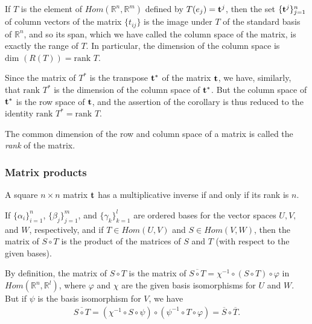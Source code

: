 \documentclass[12pt,letterpaper,reqno]{article}
\numberwithin{equation}{section}
\newcommand{\ti}[1]{\textit{#1}}
\newcommand{\fixme}[1]{{\color{orange}{[#1]}}}
\begin{document}
\begin{pf}
	If $T$ is the element of $Hom(\mathbb{R}^n,\mathbb{R}^m)$ defined by $T(e_j)={\bf t}^j$, then the set $\{{\bf t}^j\}_{j=1}^n$ of column vectors of the matrix $\{t_{ij}\}$ is the image under $T$ of the standard basis of $\mathbb{R}^n$, and so its span, which we have called the column space of the matrix, is exactly the range of $T$. In particular, the dimension of the column space is $\text{dim }(R(T))=\text{rank }T$.
	
	Since the matrix of $T^*$ is the transpose ${\bf t}^*$ of the matrix ${\bf t}$, we have, similarly, that $\text{rank }T^*$ is the dimension of the column space of ${\bf t}^*$. But the column space of ${\bf t}^*$ is the row space of ${\bf t}$, and the assertion of the corollary is thus reduced to the identity $\text{rank }T^*=\text{rank }T$.
\end{pf}

\begin{defn}
	The common dimension of the row and column space of a matrix is called the \ti{rank} of the matrix.
\end{defn}

\subsubsection{Matrix products}
\fixme{Most of this already done in a previous chapter.}
\begin{thm}
	A square $n \times n$ matrix ${\bf t}$ has a multiplicative inverse if and only if its rank is $n$.
\end{thm}

\fixme{For this and the rank theorem there are simpler proofs bases on the RREF of a matrix.}

\begin{thm}
	If $\{\alpha_i\}_{i=1}^n$, $\{\beta_j\}_{j=1}^m$, and $\{\gamma_k\}_{k=1}^l$ are ordered bases for the vector spaces $U,V,$ and $W$, respectively, and if $T \in Hom(U,V)$ and $S \in Hom(V,W)$, then the matrix of $S \circ T$ is the product of the matrices of $S$ and $T$ (with respect to the given bases).
\end{thm}

\begin{pf}
By definition, the matrix of $S \circ T$ is the matrix of $\overline{S \circ T}=\chi^{-1} \circ (S \circ T) \circ \varphi$ in $Hom(\mathbb{R}^n,\mathbb{R}^l)$, where $\varphi$ and $\chi$ are the given basis isomorphisms for $U$ and $W$. But if $\psi$ is the basis isomorphism for $V$, we have
\begin{align*}
	\overline{S \circ T}=(\chi^{-1} \circ S \circ \psi) \circ (\psi^{-1} \circ T \circ \varphi)=\overline{S} \circ \overline{T}.
\end{align*}	
\end{pf}
\end{document}
